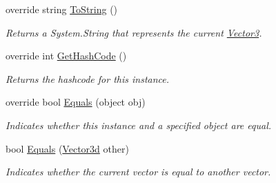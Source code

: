 \begin{DoxyCompactItemize}
override string \hyperlink{struct_open_t_k_1_1_vector3d_ab3abad1c646b9c5952867f4d9bea077a}{To\-String} ()
\begin{DoxyCompactList}\small\item\em Returns a System.\-String that represents the current \hyperlink{struct_open_t_k_1_1_vector3}{Vector3}. \end{DoxyCompactList}\item 
override int \hyperlink{struct_open_t_k_1_1_vector3d_a3b7f65557039ff2ee2586686ee8ded4a}{Get\-Hash\-Code} ()
\begin{DoxyCompactList}\small\item\em Returns the hashcode for this instance. \end{DoxyCompactList}\item 
override bool \hyperlink{struct_open_t_k_1_1_vector3d_ac93f701e73a3b72deb2df5bca6bd83cc}{Equals} (object obj)
\begin{DoxyCompactList}\small\item\em Indicates whether this instance and a specified object are equal. \end{DoxyCompactList}\item 
bool \hyperlink{struct_open_t_k_1_1_vector3d_a999d83b4d83ce030026d7c59e895d002}{Equals} (\hyperlink{struct_open_t_k_1_1_vector3d}{Vector3d} other)
\begin{DoxyCompactList}\small\item\em Indicates whether the current vector is equal to another vector.\end{DoxyCompactList}\end{DoxyCompactItemize}
